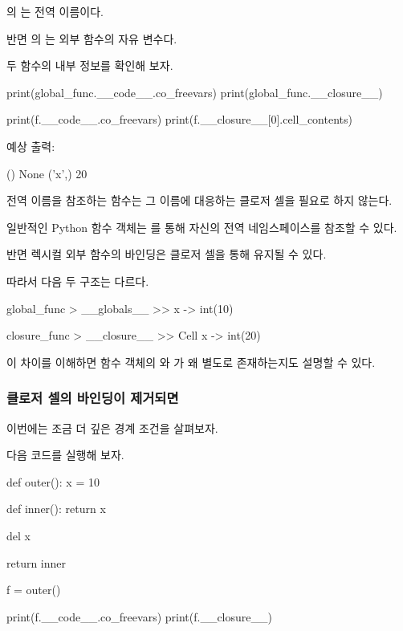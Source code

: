 의 는 전역 이름이다.

반면 의 는 외부 함수의 자유 변수다.

두 함수의 내부 정보를 확인해 보자.

\begin{dhkcode}
print(global_func.__code__.co_freevars)
print(global_func.__closure__)

print(f.__code__.co_freevars)
print(f.__closure__[0].cell_contents)
\end{dhkcode}

예상 출력:

\begin{dhkzsh}
()
None
('x',)
20
\end{dhkzsh}

전역 이름을 참조하는 함수는 그 이름에 대응하는 클로저 셀을 필요로 하지 않는다.

일반적인 Python 함수 객체는 를 통해 자신의 전역 네임스페이스를 참조할 수 있다.

반면 렉시컬 외부 함수의 바인딩은 클로저 셀을 통해 유지될 수 있다.

따라서 다음 두 구조는 다르다.

\begin{dhkdir}[in=6]
global_func
> __globals__
>> x -> int(10)
\end{dhkdir}

\begin{dhkdir}[in=6]
closure_func
> __closure__
>> Cell x -> int(20)
\end{dhkdir}

이 차이를 이해하면 함수 객체의 와 가 왜 별도로 존재하는지도 설명할 수 있다.

\subsubsection{클로저 셀의 바인딩이 제거되면}

이번에는 조금 더 깊은 경계 조건을 살펴보자.

다음 코드를 실행해 보자.

\begin{dhkcode}
def outer():
    x = 10

    def inner():
        return x

    del x

    return inner


f = outer()

print(f.__code__.co_freevars)
print(f.__closure__)
\end{dhkcode}

